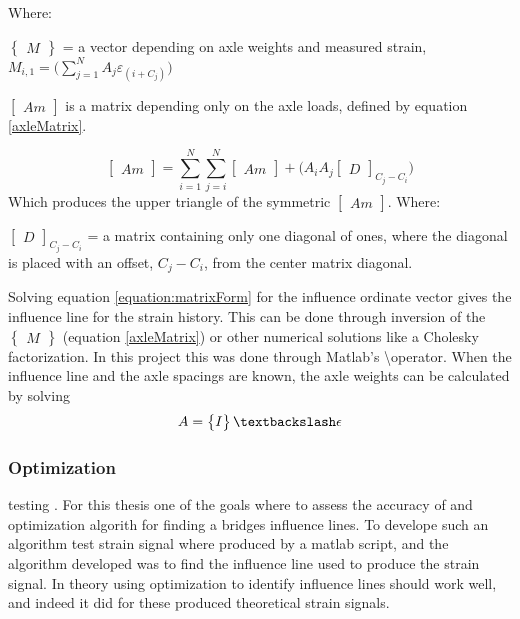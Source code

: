 Where:
\begin{description}
\item $\begin{Bmatrix} M \end{Bmatrix}$ = a vector depending on axle weights and measured strain, $M_{i, 1} = \Big(\sum_{j = 1}^{N} A_j \varepsilon_{(i+C_j)}\Big)$
\item $\begin{bmatrix} Am \end{bmatrix}$ is a matrix depending only on the axle loads, defined by equation \ref{axleMatrix}.
\end{description}
\begin{equation}
\begin{bmatrix} Am \end{bmatrix} = \sum_{i = 1}^{N} \sum_{j = i}^{N} \begin{bmatrix} Am \end{bmatrix} + \big( A_i A_j  \begin{bmatrix} D \end{bmatrix}_{C_j - C_i}\big)
\label{axleMatrix}
\end{equation}
Which produces the upper triangle of the symmetric $ \begin{bmatrix} Am \end{bmatrix} $.
Where:
\begin{description}
\item $\begin{bmatrix} D \end{bmatrix}_{C_j - C_i}$ = a matrix containing only one diagonal of ones, where the diagonal is placed with an offset, $C_j - C_i$, from the center matrix diagonal.
\end{description}
Solving equation \ref{equation:matrixForm} for the influence ordinate vector gives the influence line for the strain history. This can be done through inversion of the $\begin{Bmatrix} M \end{Bmatrix}$ (equation \ref{axleMatrix}) or other numerical solutions like a Cholesky factorization. In this project this was done through Matlab's \textbackslash operator.
When the influence line and the axle spacings are known, the axle weights can be calculated by solving
\begin{equation}
	A = \begin{Bmatrix} I \end{Bmatrix} \textbackslash \epsilon
\end{equation}
\subsubsection{Optimization}
testing \cite{Liljencrantz}.
For this thesis one of the goals where to assess the accuracy of and optimization algorith for finding a bridges influence lines. To develope such an algorithm test strain signal where produced by a matlab script, and the algorithm developed was to find the influence line used to produce the strain signal.
In theory using optimization to identify influence lines should work well, and indeed it did for these produced theoretical strain signals.

